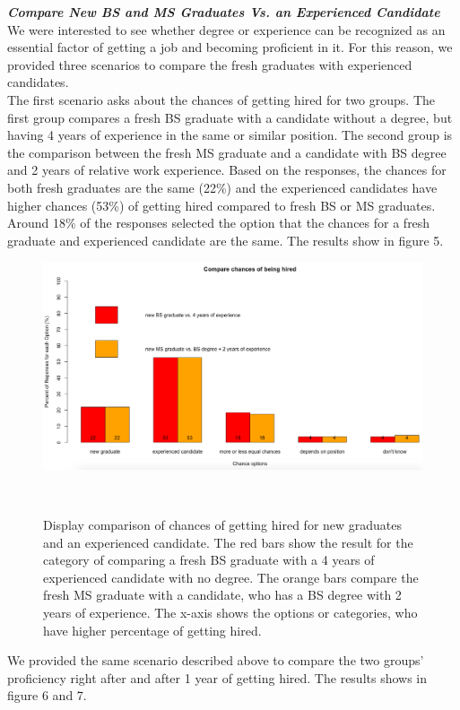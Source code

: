 \documentclass{sigchi}
\begin{document}
\textit{\textbf{Compare New BS and MS Graduates Vs. an Experienced Candidate}}\newline
We were interested to see whether degree or experience can be recognized as an essential factor of getting a job and becoming proficient in it. For this reason, we provided  three scenarios to compare the fresh graduates with experienced candidates.\\
The first scenario asks about the chances of getting hired for two groups. The first group compares a fresh BS graduate with a candidate without a degree, but having 4 years of experience in the same or similar position. The second group is the comparison between the fresh MS graduate and a candidate with BS degree and 2 years of relative work experience. Based on the responses, the chances for both fresh graduates are the same (22\%) and the experienced candidates have higher chances (53\%) of getting hired compared to fresh BS or MS graduates. Around 18\% of the responses selected the option that the chances for a fresh graduate and experienced candidate are the same. The results show in figure 5.

\begin{figure}
\centering
  \includegraphics[width=1.05\columnwidth]{figures/compare_BS_MS_exp_job_chances}
  \caption{Display comparison of chances of getting hired for new graduates and an experienced candidate. The red bars show the result for the category of comparing a fresh BS graduate with a 4 years of experienced candidate with no degree. The orange bars compare the fresh MS graduate with a candidate, who has a BS degree with 2 years of experience. The x-axis shows the options or categories, who have higher percentage of getting hired.}~\label{fig:figure 5}
\end{figure}

We provided the same scenario described above to compare the two groups' proficiency right after and after 1 year of getting hired. The results shows in figure 6 and 7.
\end{document}
